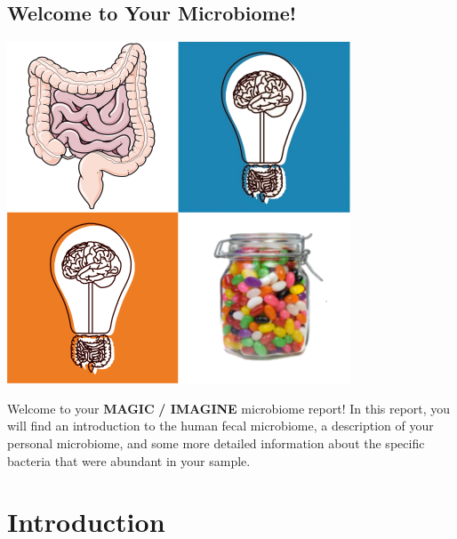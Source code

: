 \documentclass[
]{article}
\author{}
\date{\vspace{-2.5em}2023-05-26}
\begin{document}

\begin{titlepage}

\thispagestyle{cov}

\vspace*{10pt}

\begin{center}

\section{Welcome to Your Microbiome!}

\vspace*{5pt}
\includegraphics{img/cover_image.png}
\vspace*{10pt}

Welcome to your \textbf{\color{Cerulean}MAGIC} \textbf{/
\color{RedOrange}IMAGINE} microbiome report! In this report, you will find an
introduction to the human fecal microbiome, a description of your personal
microbiome, and some more detailed information about the specific bacteria that
were abundant in your sample.

\end{center}

\end{titlepage}


\section{Introduction}
\end{document}

